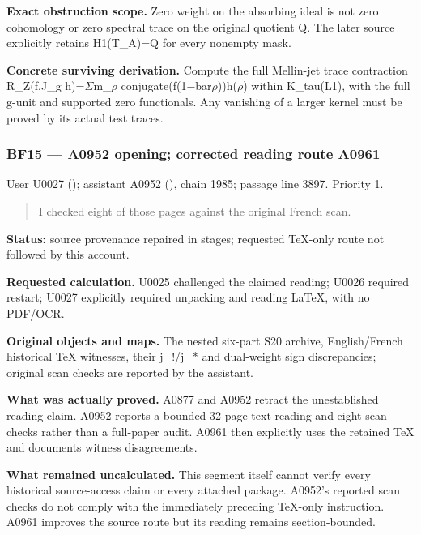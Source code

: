 \textbf{Exact obstruction scope.} Zero weight on the absorbing ideal is
not zero cohomology or zero spectral trace on the original quotient Q.
The later source explicitly retains H1(T\_A)=Q for every nonempty mask.

\textbf{Concrete surviving derivation.} Compute the full Mellin-jet
trace contraction R\_Z(f,J\_g
h)=\allowbreak{}\ensuremath{Σ}\allowbreak{}m\_\allowbreak{}\ensuremath{ρ}\allowbreak{}
conjugate(f(1\allowbreak{}\ensuremath{−}\allowbreak{}bar\allowbreak{}\ensuremath{ρ}\allowbreak{}))h(\allowbreak{}\ensuremath{ρ}\allowbreak{})
within K\_tau(L1), with the full g-unit and supported zero functionals.
Any vanishing of a larger kernel must be proved by its actual test
traces.

\subsubsection{BF15 --- A0952 opening; corrected reading route
A0961}\label{TranscriptLedgerStage:bf15-a0952-opening-corrected-reading-route-a0961}

User U0027 (\protect{});
assistant A0952 (\protect{}),
chain 1985; passage line 3897. Priority 1.

\begin{quote}
I checked eight of those pages against the original French scan.
\end{quote}

\textbf{Status:} source provenance repaired in stages; requested
TeX-only route not followed by this account.

\textbf{Requested calculation.} U0025 challenged the claimed reading;
U0026 required restart; U0027 explicitly required unpacking and reading
LaTeX, with no PDF/OCR.

\textbf{Original objects and maps.} The nested six-part S20 archive,
English/French historical TeX witnesses, their j\_!/j\_* and dual-weight
sign discrepancies; original scan checks are reported by the assistant.

\textbf{What was actually proved.} A0877 and A0952 retract the
unestablished reading claim. A0952 reports a bounded 32-page text
reading and eight scan checks rather than a full-paper audit. A0961 then
explicitly uses the retained TeX and documents witness disagreements.

\textbf{What remained uncalculated.} This segment itself cannot verify
every historical source-access claim or every attached package. A0952's
reported scan checks do not comply with the immediately preceding
TeX-only instruction. A0961 improves the source route but its reading
remains section-bounded.

